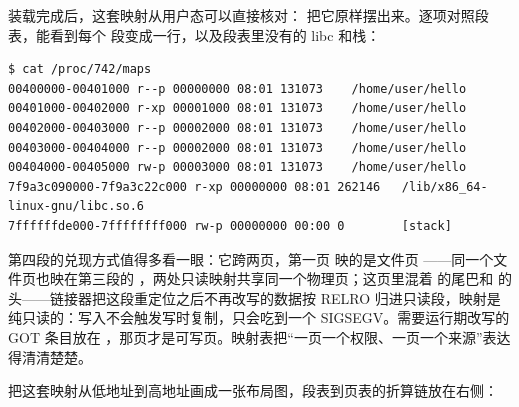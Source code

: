 装载完成后，这套映射从用户态可以直接核对： 把它原样摆出来。逐项对照段表，能看到每个  段变成一行，以及段表里没有的 libc 和栈：

\begin{lstlisting}
$ cat /proc/742/maps
00400000-00401000 r--p 00000000 08:01 131073    /home/user/hello
00401000-00402000 r-xp 00001000 08:01 131073    /home/user/hello
00402000-00403000 r--p 00002000 08:01 131073    /home/user/hello
00403000-00404000 r--p 00002000 08:01 131073    /home/user/hello
00404000-00405000 rw-p 00003000 08:01 131073    /home/user/hello
7f9a3c090000-7f9a3c22c000 r-xp 00000000 08:01 262146   /lib/x86_64-linux-gnu/libc.so.6
7ffffffde000-7ffffffff000 rw-p 00000000 00:00 0        [stack]
\end{lstlisting}

第四段的兑现方式值得多看一眼：它跨两页，第一页  映的是文件页 ——同一个文件页也映在第三段的 ，两处只读映射共享同一个物理页；这页里混着  的尾巴和  的头——链接器把这段重定位之后不再改写的数据按 RELRO 归进只读段，映射是纯只读的：写入不会触发写时复制，只会吃到一个 SIGSEGV。需要运行期改写的 GOT 条目放在 ，那页才是可写页。映射表把“一页一个权限、一页一个来源”表达得清清楚楚。

把这套映射从低地址到高地址画成一张布局图，段表到页表的折算链放在右侧：

